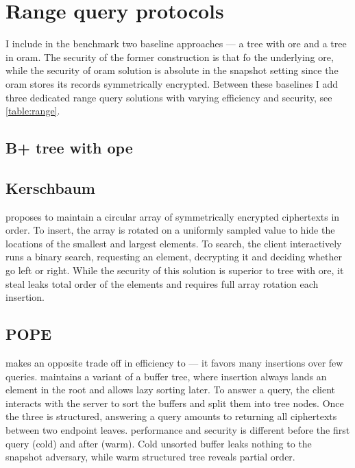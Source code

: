 		\section{Range query protocols}

			I include in the benchmark two baseline approaches --- a \BPlus{} tree with \gls{ore} and a \BPlus{} tree in \gls{oram}.
			The security of the former construction is that fo the underlying \gls{ore}, while the security of \gls{oram} solution is absolute in the snapshot setting since the \gls{oram} stores its records symmetrically encrypted.
			Between these baselines I add three dedicated range query solutions with varying efficiency and security, see \cref{table:range}.

			\subsection{B+ tree with \acrshort{ope}}

			\subsection{Kerschbaum}

				\cite{florian-protocol} proposes to maintain a circular array of symmetrically encrypted ciphertexts in order.
				To insert, the array is rotated on a uniformly sampled value to hide the locations of the smallest and largest elements.
				To search, the client interactively runs a binary search, requesting an element, decrypting it and deciding whether go left or right.
				While the security of this solution is superior to \BPlus{} tree with \gls{ore}, it steal leaks total order of the elements and requires full array rotation each insertion.

			\subsection{POPE}

				\cite{pope} makes an opposite trade off in efficiency to \cite{florian-protocol} --- it favors many insertions over few queries.
				\cite{pope} maintains a variant of a buffer tree, where insertion always lands an element in the root and allows lazy sorting later.
				To answer a query, the client interacts with the server to sort the buffers and split them into tree nodes.
				Once the three is structured, answering a query amounts to returning all ciphertexts between two endpoint leaves.
				\cite{pope} performance and security is different before the first query (cold) and after (warm).
				Cold unsorted buffer leaks nothing to the snapshot adversary, while warm structured tree reveals partial order.

